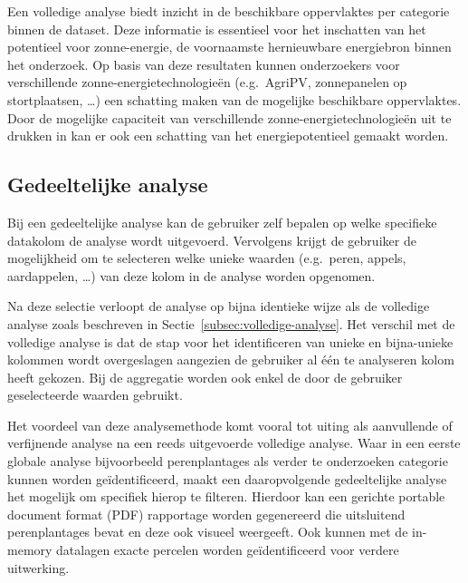 Een volledige analyse biedt inzicht in de beschikbare oppervlaktes per categorie binnen de dataset.
Deze informatie is essentieel voor het inschatten van het potentieel voor zonne-energie, de voornaamste hernieuwbare energiebron binnen het onderzoek.
Op basis van deze resultaten kunnen onderzoekers voor verschillende zonne-energietechnologieën (e.g.\ AgriPV, zonnepanelen op stortplaatsen, \ldots) een schatting maken van de mogelijke beschikbare oppervlaktes.
Door de mogelijke capaciteit van verschillende zonne-energietechnologieën uit te drukken in  kan er ook een schatting van het energiepotentieel gemaakt worden.

\subsection{Gedeeltelijke analyse}\label{subsec:gedeeltelijke-analyse}
Bij een gedeeltelijke analyse kan de gebruiker zelf bepalen op welke specifieke datakolom de analyse wordt uitgevoerd. Vervolgens krijgt de gebruiker de mogelijkheid om te selecteren welke unieke waarden (e.g.\ peren, appels, aardappelen, \ldots) van deze kolom in de analyse worden opgenomen.
\medskip

Na deze selectie verloopt de analyse op bijna identieke wijze als de volledige analyse zoals beschreven in Sectie~\ref{subsec:volledige-analyse}. Het verschil met de volledige analyse is dat de stap voor het identificeren van unieke en bijna-unieke kolommen wordt overgeslagen aangezien de gebruiker al één te analyseren kolom heeft gekozen. Bij de aggregatie worden ook enkel de door de gebruiker geselecteerde waarden gebruikt.\medskip

Het voordeel van deze analysemethode komt vooral tot uiting als aanvullende of verfijnende analyse na een reeds uitgevoerde volledige analyse. Waar in een eerste globale analyse bijvoorbeeld perenplantages als verder te onderzoeken categorie kunnen worden geïdentificeerd, maakt een daaropvolgende gedeeltelijke analyse het mogelijk om specifiek hierop te filteren. Hierdoor kan een gerichte portable document format (PDF) rapportage worden gegenereerd die uitsluitend perenplantages bevat en deze ook visueel weergeeft. Ook kunnen met de in-memory datalagen exacte percelen worden geïdentificeerd voor verdere uitwerking.

